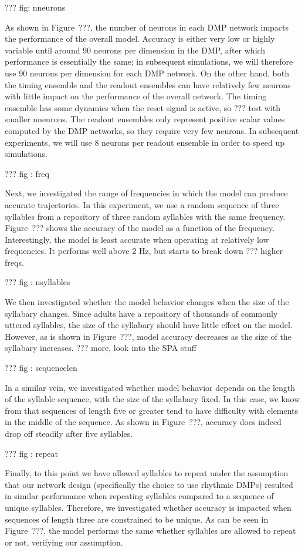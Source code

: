 ??? fig: nneurons

As shown in Figure~???,
the number of neurons in each DMP network
impacts the performance
of the overall model.
Accuracy is either very low or
highly variable until around
90 neurons per dimension
in the DMP, after which
performance is essentially the same;
in subsequent simulations,
we will therefore
use 90 neurons per dimension
for each DMP network.
On the other hand,
both the timing ensemble
and the readout ensembles
can have relatively few neurons
with little impact on
the performance of the overall network.
The timing ensemble
has some dynamics when the reset signal is active,
so ??? test with smaller nneurons.
The readout ensembles
only represent positive scalar values
computed by the DMP networks,
so they require very few neurons.
In subsequent experiments,
we will use 8 neurons per readout ensemble
in order to speed up simulations.

??? fig : freq

Next, we investigated the
range of frequencies in which the model
can produce accurate trajectories.
In this experiment, we use a random sequence
of three syllables from a
repository of three random syllables
with the same frequency.
Figure~??? shows the accuracy
of the model as a function of the frequency.
Interestingly, the model is least accurate
when operating at relatively low frequencies.
It performs well above 2 Hz,
but starts to break down ??? higher freqs.

??? fig : nsyllables

We then investigated whether the model
behavior changes when the size
of the syllabary changes.
Since adults have a repository
of thousands of commonly uttered syllables,
the size of the syllabary should have
little effect on the model.
However, as is shown in Figure~???,
model accuracy decreases
as the size of the syllabary increases.
??? more, look into the SPA stuff

??? fig : sequencelen

In a similar vein,
we investigated whether model behavior
depends on the length of the syllable sequence,
with the size of the syllabary fixed.
In this case, we know from \cite{choo2010}
that sequences of length five or greater
tend to have difficulty with elements
in the middle of the sequence.
As shown in Figure~???,
accuracy does indeed drop off steadily
after five syllables.

??? fig : repeat

Finally, to this point we have
allowed syllables to repeat
under the assumption that our network design
(specifically the choice to use rhythmic DMPs)
resulted in similar performance when
repeating syllables compared to
a sequence of unique syllables.
Therefore, we investigated whether
accuracy is impacted when
sequences of length three
are constrained to be unique.
As can be seen in Figure~???,
the model performs the same
whether syllables are allowed to repeat or not,
verifying our assumption.

